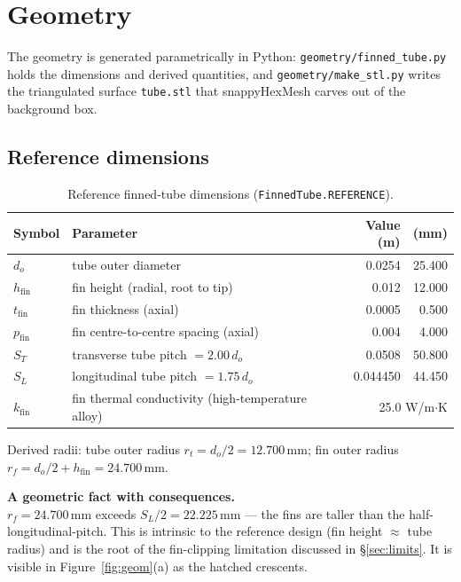 \documentclass[11pt]{article}
\newcommand{\file}[1]{\texttt{\small #1}}
\newcommand{\warnbox}[2]{%
  \begin{center}\colorbox{warnbg}{\begin{minipage}{0.94\linewidth}\vspace{3pt}
  \textbf{#1}\\[2pt]#2\vspace{3pt}\end{minipage}}\end{center}}
\begin{document}
\section{Geometry}

The geometry is generated parametrically in Python: \file{geometry/finned\_tube.py} holds the dimensions and
derived quantities, and \file{geometry/make\_stl.py} writes the triangulated surface \file{tube.stl} that
snappyHexMesh carves out of the background box.

\subsection{Reference dimensions}

\begin{table}[h]\centering\small
\caption{Reference finned-tube dimensions (\file{FinnedTube.REFERENCE}).}\label{tab:geom}
\begin{tabular}{@{}llrr@{}}
\toprule
Symbol & Parameter & Value (m) & (mm)\\
\midrule
$d_o$ & tube outer diameter & 0.0254 & 25.400\\
$h_\mathrm{fin}$ & fin height (radial, root to tip) & 0.012 & 12.000\\
$t_\mathrm{fin}$ & fin thickness (axial) & 0.0005 & 0.500\\
$p_\mathrm{fin}$ & fin centre-to-centre spacing (axial) & 0.004 & 4.000\\
$S_T$ & transverse tube pitch $=2.00\,d_o$ & 0.0508 & 50.800\\
$S_L$ & longitudinal tube pitch $=1.75\,d_o$ & 0.044450 & 44.450\\
$k_\mathrm{fin}$ & fin thermal conductivity (high-temperature alloy) & \multicolumn{2}{r}{25.0 W/m$\cdot$K}\\
\bottomrule
\end{tabular}
\end{table}

Derived radii: tube outer radius $r_t = d_o/2 = 12.700$\,mm; fin outer radius
$r_f = d_o/2 + h_\mathrm{fin} = 24.700$\,mm.

\warnbox{A geometric fact with consequences.}{$r_f = 24.700$\,mm exceeds $S_L/2 = 22.225$\,mm --- the fins are
taller than the half-longitudinal-pitch. This is intrinsic to the reference design (fin height $\approx$ tube
radius) and is the root of the fin-clipping limitation discussed in \S\ref{sec:limits}. It is visible in
Figure~\ref{fig:geom}(a) as the hatched crescents.}
\end{document}
